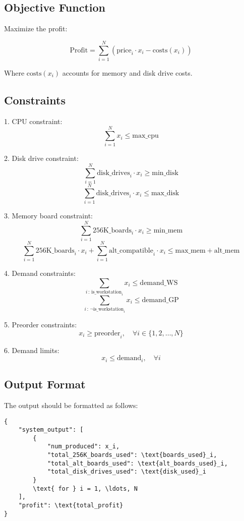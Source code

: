 \documentclass{article}
\begin{document}
\subsection*{Objective Function}
Maximize the profit:

\[
\text{Profit} = \sum_{i=1}^{N} \left( \text{price}_i \cdot x_i - \text{costs}(x_i) \right)
\]

Where \(\text{costs}(x_i)\) accounts for memory and disk drive costs.

\subsection*{Constraints}
1. CPU constraint:
\[
\sum_{i=1}^{N} x_i \leq \text{max\_cpu}
\]

2. Disk drive constraint:
\[
\sum_{i=1}^{N} \text{disk\_drives}_i \cdot x_i \geq \text{min\_disk}
\]
\[
\sum_{i=1}^{N} \text{disk\_drives}_i \cdot x_i \leq \text{max\_disk}
\]

3. Memory board constraint:
\[
\sum_{i=1}^{N} \text{256K\_boards}_i \cdot x_i \geq \text{min\_mem}
\]
\[
\sum_{i=1}^{N} \text{256K\_boards}_i \cdot x_i + \sum_{i=1}^{N} \text{alt\_compatible}_i \cdot x_i \leq \text{max\_mem} + \text{alt\_mem}
\]

4. Demand constraints:
\[
\sum_{i \,:\, \text{is\_workstation}_i} x_i \leq \text{demand\_WS}
\]
\[
\sum_{i \,:\, \neg \text{is\_workstation}_i} x_i \leq \text{demand\_GP}
\]

5. Preorder constraints:
\[
x_i \geq \text{preorder}_i, \quad \forall i \in \{1, 2, \ldots, N\}
\]

6. Demand limits:
\[
x_i \leq \text{demand}_i, \quad \forall i
\]

\subsection*{Output Format}
The output should be formatted as follows:
\begin{verbatim}
{
    "system_output": [
        {
            "num_produced": x_i,
            "total_256K_boards_used": \text{boards_used}_i,
            "total_alt_boards_used": \text{alt_boards_used}_i,
            "total_disk_drives_used": \text{disk_used}_i
        } 
        \text{ for } i = 1, \ldots, N
    ],
    "profit": \text{total_profit}
}
\end{verbatim}
\end{document}
